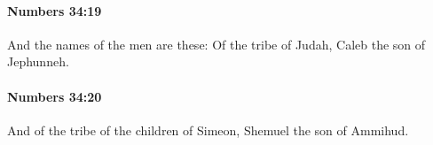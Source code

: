 		\paragraph{Numbers 34:19} %
			\label{NUMBERS-34-19}

			And the names of the men are these: Of the tribe of Judah, Caleb the son of Jephunneh.


		\paragraph{Numbers 34:20} %
			\label{NUMBERS-34-20}

			And of the tribe of the children of Simeon, Shemuel the son of Ammihud.


